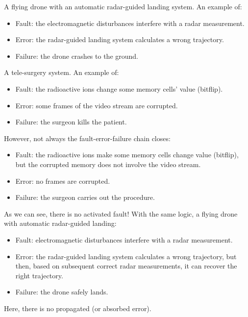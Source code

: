 \begin{examplebox}
    A flying drone with an automatic radar-guided landing system. An example of:
    \begin{itemize}
        \item Fault: the electromagnetic disturbances interfere with a radar measurement.
        \item Error: the radar-guided landing system calculates a wrong trajectory.
        \item Failure: the drone crashes to the ground.
    \end{itemize}
\end{examplebox}

\begin{examplebox}
    A tele-surgery system. An example of:
    \begin{itemize}
        \item Fault: the radioactive ions change some memory cells' value (bitflip).
        \item Error: some frames of the video stream are corrupted.
        \item Failure: the surgeon kills the patient.
    \end{itemize}
    However, not always the fault-error-failure chain closes:
    \begin{itemize}
        \item Fault: the radioactive ions make some memory cells change value (bitflip), but the corrupted memory does not involve the video stream.
        \item Error: no frames are corrupted.
        \item Failure: the surgeon carries out the procedure.
    \end{itemize}
    As we can see, there is no activated fault! With the same logic, a flying drone with automatic radar-guided landing:
    \begin{itemize}
        \item Fault: electromagnetic disturbances interfere with a radar measurement.
        \item Error: the radar-guided landing system calculates a wrong trajectory, but then, based on subsequent correct radar measurements, it can recover the right trajectory.
        \item Failure: the drone safely lands.
    \end{itemize}
    Here, there is no propagated (or absorbed error).
\end{examplebox}

